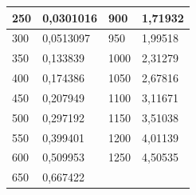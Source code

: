 \documentclass[11pt,openany]{book}
\begin{document}
\begin{figure}[H]
\begin{minipage}{0.5\textwidth}
\begin{tabular}{|l|l|l|l|}
            250             & 0,0301016       & 900             & 1,71932         \\ \hline
            300             & 0,0513097       & 950             & 1,99518         \\ \hline
            350             & 0,133839        & 1000            & 2,31279         \\ \hline
            400             & 0,174386        & 1050            & 2,67816         \\ \hline
            450             & 0,207949        & 1100            & 3,11671         \\ \hline
            500             & 0,297192        & 1150            & 3,51038         \\ \hline
            550             & 0,399401        & 1200            & 4,01139         \\ \hline
            600             & 0,509953        & 1250            & 4,50535         \\ \hline
            650             & 0,667422        & ~               &                 \\ \hline
        \end{tabular}
    \end{minipage}
\end{figure}
\end{document}
